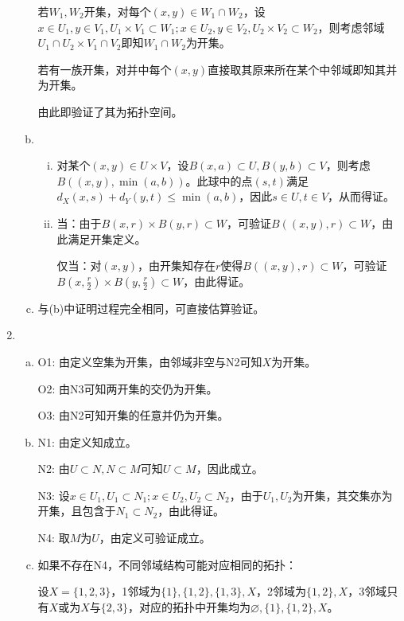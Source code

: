 \documentclass[a4paper,UTF8,fontset=windows]{ctexart}
\begin{document}
\begin{enumerate}[(1)]
\begin{enumerate}[(a)]
    若$W_1,W_2$开集，对每个$(x,y)\in W_1\cap W_2$，设$x\in U_1,y\in V_1,U_1\times V_1\subset W_1;x\in U_2,y\in V_2,U_2\times V_2\subset W_2$，则考虑邻域$U_1\cap U_2\times V_1\cap V_2$即知$W_1\cap W_2$为开集。
    
    若有一族开集，对并中每个$(x,y)$直接取其原来所在某个中邻域即知其并为开集。
    
    由此即验证了其为拓扑空间。
    
    \item
    \begin{enumerate}[(i)]
    \item
    对某个$(x,y)\in U\times V$，设$B(x,a)\subset U,B(y,b)\subset V$，则考虑$B((x,y),\min(a,b))$。此球中的点$(s,t)$满足$d_X(x,s)+d_Y(y,t)\le\min(a,b)$，因此$s\in U,t\in V$，从而得证。
    
    \item
    当：由于$B(x,r)\times B(y,r)\subset W$，可验证$B((x,y),r)\subset W$，由此满足开集定义。
    
    仅当：对$(x,y)$，由开集知存在$r$使得$B((x,y),r)\subset W$，可验证$B(x,\frac{r}{2})\times B(y,\frac{r}{2})\subset W$，由此得证。
    \end{enumerate}
    
    \item
    与(b)中证明过程完全相同，可直接估算验证。
    \end{enumerate}
    
    \item
    \begin{enumerate}[(a)]
    \item
    O1: 由定义空集为开集，由邻域非空与N2可知$X$为开集。
    
    O2: 由N3可知两开集的交仍为开集。
    
    O3: 由N2可知开集的任意并仍为开集。
    
    \item
    
    N1: 由定义知成立。
    
    N2: 由$U\subset N,N\subset M$可知$U\subset M$，因此成立。
    
    N3: 设$x\in U_1,U_1\subset N_1;x\in U_2,U_2\subset N_2$，由于$U_1,U_2$为开集，其交集亦为开集，且包含于$N_1\subset N_2$，由此得证。
    
    N4: 取$M$为$U$，由定义可验证成立。
    
    \item
    如果不存在N4，不同邻域结构可能对应相同的拓扑：
    
    设$X=\{1,2,3\}$，1邻域为$\{1\},\{1,2\},\{1,3\},X$，2邻域为$\{1,2\},X$，3邻域只有$X$或为$X$与$\{2,3\}$，对应的拓扑中开集均为$\varnothing,\{1\},\{1,2\},X$。
    

\end{enumerate}
\end{enumerate}
\end{document}
